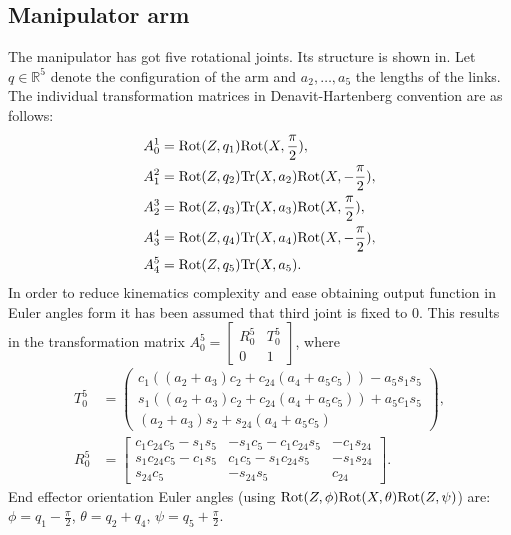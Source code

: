 \subsection{Manipulator arm}
The manipulator has got five rotational joints. Its structure is shown in. %
Let $q\in \mathbb{R}^5$ denote the configuration of the arm and $a_2, \dots, a_5$ the lengths of the links. The individual transformation matrices in Denavit-Hartenberg convention are as follows:
\begin{align*}
A_0^1 &= \mathrm{Rot}(Z, q_1)\mathrm{Rot}(X, \frac{\pi}{2}),\\
A_1^2 &= \mathrm{Rot}(Z, q_2)\mathrm{Tr} (X, a_2)\mathrm{Rot}(X, -\frac{\pi}{2}),\\
A_2^3 &= \mathrm{Rot}(Z, q_3)\mathrm{Tr} (X, a_3)\mathrm{Rot}(X, \frac{\pi}{2}),\\
A_3^4 &= \mathrm{Rot}(Z, q_4)\mathrm{Tr} (X, a_4)\mathrm{Rot}(X, -\frac{\pi}{2}),\\
A_4^5 &= \mathrm{Rot}(Z, q_5)\mathrm{Tr} (X, a_5).
\end{align*}
In order to reduce kinematics complexity and ease obtaining output function in Euler angles form it has been assumed that third joint is fixed to $0$. This results in the transformation matrix $
A_0^5=\begin{bmatrix}
R_0^5 & T_0^5\\
0 & 1
\end{bmatrix}$, 
where
\begin{align*}
T_0^5 &= \begin{pmatrix}
c_1\left((a_2+a_3)c_2 + c_{24}(a_4+a_5c_5)\right) - a_5s_1s_5\\
s_1\left((a_2+a_3)c_2 + c_{24}(a_4+a_5c_5)\right) + a_5c_1s_5\\
    (a_2+a_3)s_2 + s_{24}(a_4+a_5c_5)
\end{pmatrix},\\
R_0^5 &= \begin{bmatrix}
c_1c_{24}c_5-s_1s_5 & -s_1c_5-c_1c_{24}s_5 & -c_1s_{24}\\
s_1c_{24}c_5-c_1s_5 &  c_1c_5-s_1c_{24}s_5 & -s_1s_{24}\\
s_{24}c_5           & -s_{24}s_5           &  c_{24}
\end{bmatrix}.
\end{align*}
End effector orientation Euler angles (using $\mathrm{Rot}(Z,\phi)\mathrm{Rot}(X, \theta)\mathrm{Rot}(Z, \psi)$) are: $\phi=q_1-\frac{\pi}{2}$, $\theta=q_2+q_4$, $\psi=q_5+\frac{\pi}{2}$.

